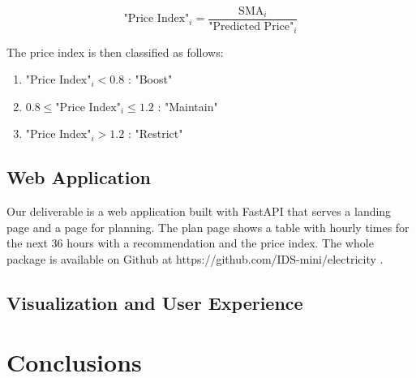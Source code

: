 \documentclass{article}
\begin{document}
\begin{equation} \label{eq:index}
\text{"Price Index"}_i = \frac{\text{SMA}_i}{\text{"Predicted Price"}_i}
\end{equation}

The price index is then classified as follows:

\begin{enumerate}
    \item $\text{"Price Index"}_i < 0.8$ : "Boost"
    \item $0.8 \leq \text{"Price Index"}_i \leq 1.2$ : "Maintain"
    \item $\text{"Price Index"}_i > 1.2$ : "Restrict"
\end{enumerate}

\subsection{Web Application}
\label{subsection:server}

Our deliverable is a web application built with FastAPI that serves a landing page and a page for planning. The plan page shows a table with hourly times for the next 36 hours with a recommendation and the price index. The whole package is available on Github at https://github.com/IDS-mini/electricity .

\subsection{Visualization and User Experience}
\label{subsection:ux}


\section{Conclusions}
\label{section:conclusions}

\end{document}
